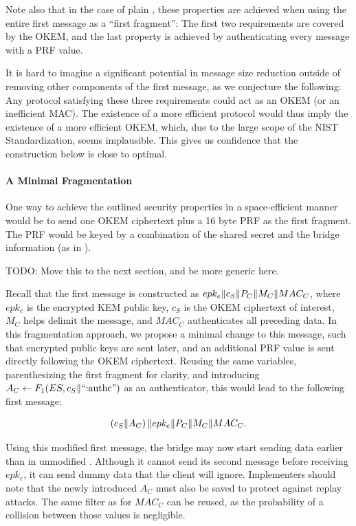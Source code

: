 Note also that in the case of plain \drivel{}, these properties are achieved when using the entire first message as a ``first fragment'': The first two requirements are covered by the OKEM, and the last property is achieved by authenticating every message with a PRF value.

It is hard to imagine a significant potential in message size reduction outside of removing other components of the first \drivel{} message, as we conjecture the following: Any protocol satisfying these three requirements could act as an OKEM (or an inefficient MAC). The existence of a more efficient protocol would thus imply the existence of a more efficient OKEM, which, due to the large scope of the NIST Standardization, seems implausible. This gives us confidence that the construction below is close to optimal.

\paragraph{A Minimal Fragmentation}
One way to achieve the outlined security properties in a space-efficient manner would be to send one OKEM ciphertext plus a 16 byte PRF as the first fragment. The PRF would be keyed by a combination of the shared secret and the bridge information (as in \drivel{}).

TODO: Move this to the next section, and be more generic here.

Recall that the first \drivel{} message is constructed as $epk_e \| c_S \| P_C \| M_C \| MAC_C$, where $epk_e$ is the encrypted KEM public key, $c_S$ is the OKEM ciphertext of interest, $M_C$ helps delimit the message, and $MAC_C$ authenticates all preceding data. In this fragmentation approach, we propose a minimal change to this message, such that encrypted public keys are sent later, and an additional PRF value is sent directly following the OKEM ciphertext. Reusing the same variables, parenthesizing the first fragment for clarity, and introducing $A_C \gets F_1(ES, c_S \| \text{``:authc''})$ as an authenticator, this would lead to the following first message:

\[
    \left( c_S \| A_C \right) \| epk_e \| P_C \| M_C \| MAC_C .
\]

Using this modified first message, the bridge may now start sending data earlier than in unmodified \drivel{}. Although it cannot send its second message before receiving $epk_e$, it can send dummy data that the client will ignore.
Implementers should note that the newly introduced $A_C$ must also be saved to protect against replay attacks. The same filter as for $MAC_C$ can be reused, as the probability of a collision between those values is negligible.

